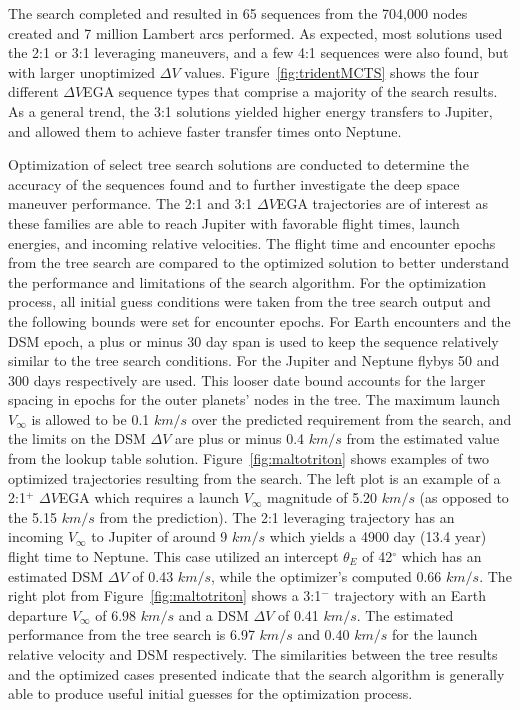\documentclass[letterpaper, preprint, paper,11pt]{AAS}	%
\begin{document}
The search completed and resulted in 65 sequences from the 704,000 nodes created and 7 million Lambert arcs performed. As expected, most solutions used the 2:1 or 3:1 leveraging maneuvers, and a few 4:1 sequences were also found, but with larger unoptimized $\Delta V$ values. Figure~\ref{fig:tridentMCTS} shows the four different $\Delta V$EGA sequence types that comprise a majority of the search results. As a general trend, the 3:1 solutions yielded higher energy transfers to Jupiter, and allowed them to achieve faster transfer times onto Neptune.

Optimization of select tree search solutions are conducted to determine the accuracy of the sequences found and to further investigate the deep space maneuver performance. The 2:1 and 3:1 $\Delta V$EGA trajectories are of interest as these families are able to reach Jupiter with favorable flight times, launch energies, and incoming relative velocities. The flight time and encounter epochs from the tree search are compared to the optimized solution to better understand the performance and limitations of the search algorithm. For the optimization process, all initial guess conditions were taken from the tree search output and the following bounds were set for encounter epochs. For Earth encounters and the DSM epoch, a plus or minus 30 day span is used to keep the sequence relatively similar to the tree search conditions. For the Jupiter and Neptune flybys 50 and 300 days respectively are used. This looser date bound accounts for the larger spacing in epochs for the outer planets' nodes in the tree. The maximum launch $V_\infty$ is allowed to be 0.1 $km/s$ over the predicted requirement from the search, and the limits on the DSM $\Delta V$ are plus or minus 0.4 $km/s$ from the estimated value from the lookup table solution. Figure~\ref{fig:maltotriton} shows examples of two optimized trajectories resulting from the search. The left plot is an example of a 2:1$^{+}$ $\Delta V$EGA which requires a launch $V_\infty$ magnitude of 5.20 $km/s$ (as opposed to the \hspace{0.5px} 5.15 $km/s$ from the prediction). The 2:1 leveraging trajectory has an incoming $V_\infty$ to Jupiter of around 9 $km/s$ which yields a 4900 day (13.4 year) flight time to Neptune. This case utilized an intercept $\theta_E$ of 42$^\circ$ which has an estimated DSM $\Delta V$ of 0.43 $km/s$, while the optimizer's computed 0.66 $km/s$. The right plot from Figure~\ref{fig:maltotriton} shows a 3:1$^{-}$ trajectory with an Earth departure $V_\infty$ of 6.98 $km/s$ and a DSM $\Delta V$ of 0.41 $km/s$. The estimated performance from the tree search is 6.97 $km/s$ and 0.40 $km/s$ for the launch relative velocity and DSM respectively. The similarities between the tree results and the optimized cases presented indicate that the search algorithm is generally able to produce useful initial guesses for the optimization process.
\end{document}
